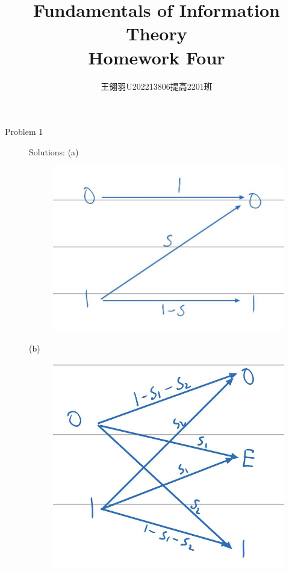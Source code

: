 \documentclass[11pt]{article}
\begin{document}
\title{\vspace{-2cm}Fundamentals of Information Theory\\ Homework Four}
\author{王翎羽\quad U202213806\quad 提高2201班}
\maketitle

\begin{description}
    \item[Problem 1] Solutions:
        \subitem(a)
            \begin{figure}[htbp]
            \centering
            \includegraphics[scale=0.2]{1}
            \label{fig:figure1}
            \end{figure}
        \subitem(b)
            \begin{figure}[htbp]
            \centering
            \includegraphics[scale=0.2]{2}

\end{figure}
\end{description}
\end{document}
